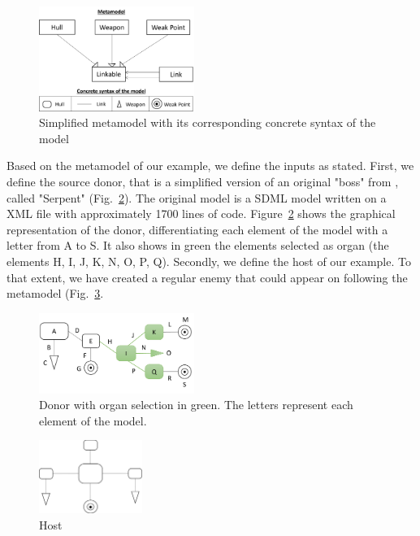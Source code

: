 \begin{figure}[h]
    \centering
    \includegraphics[width=0.45\textwidth]{Figures/metamodel+syntax.png}
    \caption{Simplified metamodel with its corresponding concrete syntax of the model}
    \label{fig:metamodel+syntax}
\end{figure}

Based on the metamodel of our example, we define the inputs as stated. 
First, we define the source donor, that is a simplified version of an original "boss" from \CaseStudy{}, called "Serpent" (Fig.~\ref{fig:donor}). The original model is a SDML model written on a XML file with approximately 1700 lines of code. Figure~\ref{fig:donor} shows the graphical representation of the donor, differentiating each element of the model with a letter from A to S. It also shows in green the elements selected as organ (the elements H, I, J, K, N, O, P, Q).
Secondly, we define the host of our example. To that extent, we have created a regular enemy that could appear on \CaseStudy{} following the metamodel (Fig.~\ref{fig:host}.

\begin{figure}[h]
    \centering
    \includegraphics[width=0.45\textwidth]{Figures/donor+organ.png}
    \caption{Donor with organ selection in green. The letters represent each element of the model.}
    \label{fig:donor}
\end{figure}

\begin{figure}[h]
    \centering
    \includegraphics[width=0.3\textwidth]{Figures/host.png}
    \caption{Host}
    \label{fig:host}
\end{figure}

